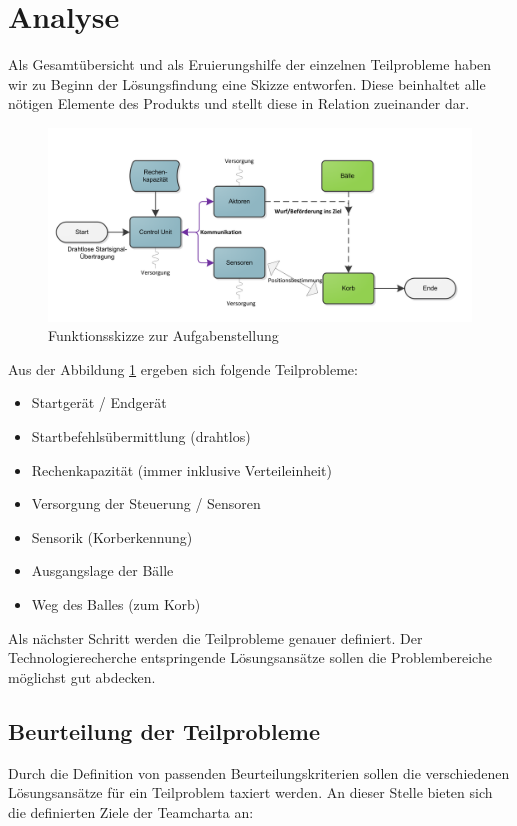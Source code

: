 \section{Analyse}
	Als Gesamtübersicht und als Eruierungshilfe der einzelnen Teilprobleme haben wir zu Beginn der Lösungsfindung eine Skizze entworfen. Diese beinhaltet alle nötigen Elemente des Produkts und stellt diese in Relation zueinander dar. 
	
	\begin{figure}[h!]
		\includegraphics[width=1.1\textwidth]{Morphologie/Bilder/Blockschaltbild}
		\centering
		\caption{Funktionsskizze zur Aufgabenstellung}
		\label{abb:Blockschaltbild} 
	\end{figure}
	
	Aus der Abbildung \ref{abb:Blockschaltbild} ergeben sich folgende Teilprobleme:
	\begin{itemize}
		\item Startgerät / Endgerät
		\item Startbefehlsübermittlung (drahtlos)
		\item Rechenkapazität (immer inklusive Verteileinheit)
		\item Versorgung der Steuerung / Sensoren
		\item Sensorik (Korberkennung)
		\item Ausgangslage der Bälle
		\item Weg des Balles (zum Korb)
	\end{itemize}
	Als nächster Schritt werden die Teilprobleme genauer definiert. Der Technologierecherche entspringende Lösungsansätze sollen die Problembereiche möglichst gut abdecken.
	
	\subsection{Beurteilung der Teilprobleme}
		Durch die Definition von passenden Beurteilungskriterien sollen die verschiedenen Lösungsansätze für ein Teilproblem taxiert werden. An dieser Stelle bieten sich die definierten Ziele der Teamcharta an:
		
